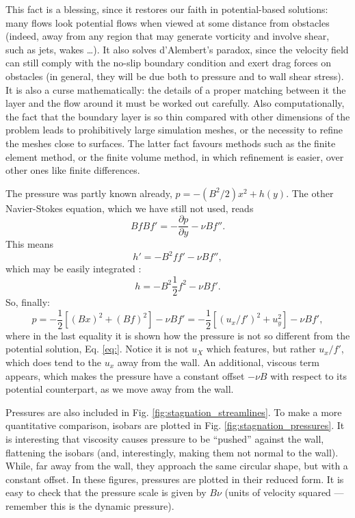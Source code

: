 This fact is a blessing, since it restores our faith in
potential-based solutions: many flows look potential flows when viewed
at some distance from obstacles (indeed, away from any region that may
generate vorticity and involve shear, such as jets, wakes \ldots). It
also solves d'Alembert's paradox, since the velocity field can still
comply with the no-slip boundary condition and exert drag forces on
obstacles (in general, they will be due both to pressure and to wall
shear stress). It is also a curse mathematically: the details of a
proper matching between it the layer and the flow around it must be
worked out carefully. Also computationally, the fact that the boundary
layer is so thin compared with other dimensions of the problem leads
to prohibitively large simulation meshes, or the necessity to refine
the meshes close to surfaces. The latter fact favours methods such as
the finite element method, or the finite volume method, in which
refinement is easier, over other ones like finite differences.

The pressure was partly known already, $p=-(B^2/2) x^2 + h(y)$. The other
Navier-Stokes equation, which we have still not used, reads
\[
B f B f'  =  - \frac{\partial p}{\partial y} -
\nu B  f'' .
\]
This means
\[
h' = - B^2 f f' - \nu B f'' ,
\]
which may be easily integrated :
\[
h = -B^2 \frac12 f^2  - \nu B f' .
\]
So, finally:
\[
p = -\frac{1}{2} \left[
  (B x)^2 +
  (B f)^2
  \right]  - \nu B f' =
 -\frac{1}{2} \left[
  (u_x / f' )^2 +
  u_y^2
  \right]  - \nu B f' ,
 \]
 where in the last equality it is shown how the pressure is not so
 different from the potential solution, Eq. \ref{eq:}.
%
 Notice it is not $u_X$ which features, but rather $u_x/f'$, which
 does tend to the $u_x$ away from the wall. An additional, viscous
 term appears, which makes the pressure have a constant offset
 $-\nu B$ with respect to its potential counterpart, as we move
 away from the wall.

 Pressures are also included in Fig.
 \ref{fig:stagnation_streamlines}. To make a more quantitative
 comparison, isobars are plotted in
 Fig. \ref{fig:stagnation_pressures}. It is interesting that viscosity
 causes pressure to be ``pushed'' against the wall, flattening the
 isobars (and, interestingly, making them not normal to the
 wall). While, far away from the wall, they approach the same circular
 shape, but with a constant offset. In these figures, pressures are
 plotted in their reduced form. It is easy to check that the pressure
 scale is given by $B \nu$ (units of velocity squared --- remember this
 is the dynamic pressure).

